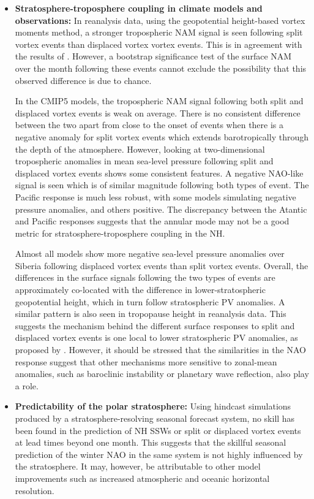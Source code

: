 \begin{itemize}
\item\textbf{Stratosphere-troposphere coupling in climate models and
    observations:} In reanalysis data, using the geopotential height-based
  vortex moments method, a stronger tropospheric NAM signal is seen following
  split vortex events than displaced vortex vortex events. This is in agreement
  with the results of \citet{Mitchell2013}. However, a bootstrap significance
  test of the surface NAM over the month following these events cannot exclude
  the possibility that this observed difference is due to chance. 

  In the CMIP5 models, the tropospheric NAM signal following both split and
  displaced vortex events is weak on average. There is no consistent difference
  between the two apart from close to the onset of events when there is a
  negative anomaly for split vortex events which extends barotropically through
  the depth of the atmosphere. However, looking at two-dimensional tropospheric
  anomalies in mean sea-level pressure following split and displaced vortex
  events shows some consistent features. A negative NAO-like signal is seen
  which is of similar magnitude following both types of event. The Pacific
  response is much less robust, with some models simulating negative pressure
  anomalies, and others positive. The discrepancy between the Atantic and
  Pacific responses suggests that the annular mode may not be a good metric for
  stratosphere-troposphere coupling in the NH.

  Almost all models show more negative sea-level pressure anomalies over Siberia
  following displaced vortex events than split vortex events. Overall, the
  differences in the surface signals following the two types of events are
  approximately co-located with the difference in lower-stratospheric
  geopotential height, which in turn follow stratospheric PV anomalies. A
  similar pattern is also seen in tropopause height in reanalysis data. This
  suggests the mechanism behind the different surface responses to split and
  displaced vortex events is one local to lower stratospheric PV anomalies, as
  proposed by \citet{Ambaum2002}. However, it should be stressed that the
  similarities in the NAO response suggest that other mechanisms more sensitive
  to zonal-mean anomalies, such as baroclinic instability or planetary wave
  reflection, also play a role. 

\item\textbf{Predictability of the polar stratosphere:} Using hindcast
  simulations produced by a stratosphere-resolving seasonal forecast system, no
  skill has been found in the prediction of NH SSWs or split or displaced vortex
  events at lead times beyond one month. This suggests that the skillful
  seasonal prediction of the winter NAO in the same system \citep{Scaife2013} is
  not highly influenced by the stratosphere. It may, however, be attributable to
  other model improvements such as increased atmospheric and oceanic horizontal
  resolution.


\end{itemize}
